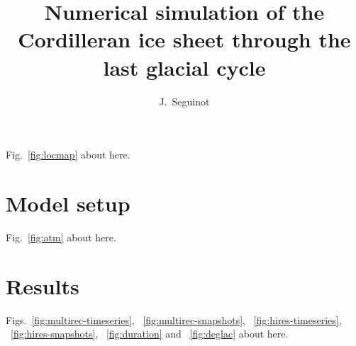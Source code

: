 \documentclass[tc, ms]{copernicus}
\begin{document}
\hack{\sloppy}

\title{Numerical simulation of the Cordilleran ice sheet
       through the last glacial cycle}

\author[1,2]{J.~Seguinot}



\received{}
\accepted{}
\published{}

\maketitle

\begin{abstract}
\end{abstract}


\introduction
\label{sec:intro}

Fig.~\ref{fig:locmap} about here.

\section{Model setup}
\label{sec:model}

Fig.~\ref{fig:atm} about here.

\section{Results}
\label{sec:results}

Figs.~\ref{fig:multirec-timeseries}, ~\ref{fig:multirec-snapshots},
~\ref{fig:hires-timeseries}, ~\ref{fig:hires-snapshots},
~\ref{fig:duration} and ~\ref{fig:deglac} about here.
\end{document}
